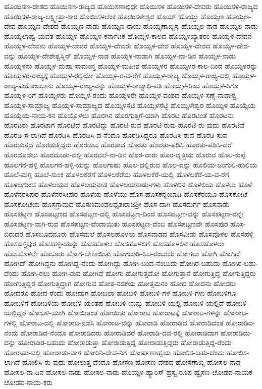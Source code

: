 {ಹೊಯಿಸಣ-ದೇಶದ
ಹೊಯಿಸಣ-ರಾಜ್ಯದ
ಹೊಯಿಸಣಾಭಿಧೇ
ಹೊಯಿಸಳ
ಹೊಯಿಸಳ-ದೇವರು
ಹೊಯಿಸಳ-ರಾಜ್ಯದ
ಹೊಯಿಸಳ-ರಾಜ್ಯ-ಲಕ್ಷ್ಮೀಪ್ರಾ-ಕಾರ
ಹೊಯಿಸಳಲೆಂಕ
ಹೊಯಿಸಳೇಶ್ವರ
ಹೊಯ್
ಹೊಯ್ದು
ಹೊಯ್ಸಣ
ಹೊಯ್ಸಣ-ದೇವ
ಹೊಯ್ಸಣ-ದೇಶದ
ಹೊಯ್ಸಣ-ನಾಡು
ಹೊಯ್ಸಣ-ರಾಯ
ಹೊಯ್ಸಣಾಖ್ಯಸ್ಯ
ಹೊಯ್ಸಲ-ನಾಡ
ಹೊಯ್ಸಲ-ನಾಡು
ಹೊಯ್ಸಲಾಹ್ವ-ಯವತ
ಹೊಯ್ಸಳ
ಹೊಯ್ಸಳ-ಕರ್ನಾಟಕ
ಹೊಯ್ಸಳ-ಕಾಲದ
ಹೊಯ್ಸಳಖ್ಯಾತರಂ
ಹೊಯ್ಸಳ-ದೇವನ
ಹೊಯ್ಸಳ-ದೇವನು
ಹೊಯ್ಸಳ-ದೇವರ
ಹೊಯ್ಸಳ-ದೇವರು
ಹೊಯ್ಸಳ-ದೇಶ
ಹೊಯ್ಸಳ-ದೇಶದ
ಹೊಯ್ಸಳ-ದೇಶ-ವನ್ನು
ಹೊಯ್ಸಳ-ದೇಶೇತ್ವಸ್ಮಿನ್
ಹೊಯ್ಸಳ-ನಾಡ
ಹೊಯ್ಸಳ-ನಾಡಾಗಿ
ಹೊಯ್ಸಳ-ನಾ-ಡಿನ
ಹೊಯ್ಸಳ-ನಾಡು
ಹೊಯ್ಸಳನು
ಹೊಯ್ಸಳ-ಮಹಾ-ಸಾಮಂನ್ತ
ಹೊಯ್ಸಳ-ಮಹೀಶ
ಹೊಯ್ಸಳರ
ಹೊಯ್ಸಳರ-ಕಾಲ-ದಿಂದ
ಹೊಯ್ಸಳರನ್ನು
ಹೊಯ್ಸಳರ-ರಾಜ್ಯಕ್ಕೆ
ಹೊಯ್ಸಳ-ರಲ್ಲಿಯೇ
ಹೊಯ್ಸಳ-ರ-ವ-ರೆಗೆ
ಹೊಯ್ಸಳ-ರಾಜ್ಯ
ಹೊಯ್ಸಳ-ರಾಜ್ಯ-ದಲ್ಲಿ
ಹೊಯ್ಸಳ-ರಾಜ್ಯ-ಪಯೋಜಭಾನು
ಹೊಯ್ಸಳ-ರಾಜ್ಯ-ವನ್ನು
ಹೊಯ್ಸಳ-ರಾಜ್ಯಾಧಿ-ಪತಿ
ಹೊಯ್ಸಳ-ರಿಂದ
ಹೊಯ್ಸಳ-ರಿಗೂ
ಹೊಯ್ಸಳ-ರಿಗೆ
ಹೊಯ್ಸಳರು
ಹೊಯ್ಸಳ-ರೆಂದು
ಹೊಯ್ಸಳರೇ
ಹೊಯ್ಸಳ-ವಂಶದ
ಹೊಯ್ಸಳ-ಸಣ್ನೆ-ನಾಡಾಳ್ವ
ಹೊಯ್ಸಳ-ಸಾಮ್ರಾಜ್ಯ
ಹೊಯ್ಸಳ-ಸಾಮ್ರಾಜ್ಯದ
ಹೊಯ್ಸಳಸೆಟಿ
ಹೊಯ್ಸಳಸೆಟ್ಟಿ
ಹೊಯ್ಸಳೇಶ್ವರ
ಹೊಯ್ಸಿಳ
ಹೊಯ್ಸೆಯ
ಹೊಯ್ಸೆಯ-ನಾಯ-ಕನ
ಹೊಯ್ಸೊಳಲು
ಹೊರಗಿನ
ಹೊರಗುತ್ತಿಗೆ-ಯಾಗಿ
ಹೊರಟ
ಹೊರಟಂತೆ
ಹೊರಟನು
ಹೊರಟರು
ಹೊರಟಾಗ
ಹೊರಟಿದೆ
ಹೊರಟಿದ್ದು
ಹೊರಟಿ-ರುವ
ಹೊರಟಿ-ರುವು
ಹೊರಟಿ-ರು-ವುದು
ಹೊರಟಿವೆ
ಹೊರಡಿ-ಸ-ಲಾಗಿದೆ
ಹೊರಡಿಸಿ
ಹೊರಡಿಸಿ-ದ-ನೆಂದೂ
ಹೊರಡಿಸಿದ್ದರೂ
ಹೊರಡಿಸಿ-ರುವ
ಹೊರಡಿ-ಸುವ
ಹೊರಡುತ್ತದೆ
ಹೊರಡುತ್ತಿದ್ದರು
ಹೊರಡುವ
ಹೊರತಾದ
ಹೊರತು
ಹೊರತು-ಪಡಿಸಿ
ಹೊರತು-ಪಡಿಸಿ-ದರೆ
ಹೊರದೂಡಲು
ಹೊರದೂಡು-ವಲ್ಲಿ
ಹೊರವಲೆ-ನಾ-ಡಿನ
ಹೊರ-ವಾರು
ಹೊರ-ವೃತ್ತಿಯ
ಹೊರುವ
ಹೊಲ-ಕುಪ್ಪೆ
ಹೊಲಗನ-ಹಳ್ಳಿ
ಹೊಲಗನ-ಹಳ್ಳಿ-ಯನ್ನು
ಹೊಲಗಾಹು
ಹೊಲ-ದಲ್ಲಿರುವ
ಹೊಲ-ವನ್ನು
ಹೊಲಿಯ-ಜಂಗುಲಿ-ಹುಲಿಯ
ಹೊಲೆ-ಮಗ್ಗ
ಹೊಲೆ-ಸುಂಕ
ಹೊಳಲಕೆರೆಗೆ
ಹೊಳಲಕೆರೆಯ
ಹೊಳಲಕೆರೆ-ಯಲ್ಲಿ
ಹೊಳಲಕೆರೆ-ಯ-ವ-ರೆಗೆ
ಹೊಳಲಗುಂದ
ಹೊಳಲಯದ
ಹೊಳಲಯನಾಡ
ಹೊಳಲಯನಾಡು-ಗಳು
ಹೊಳಲಿನ
ಹೊಳಲಿಯ
ಹೊಳಲು
ಹೊಳೆ
ಹೊಳೆನರಸಿಪುರ
ಹೊಳೆನರಸೀಪುರ
ಹೊಳೆಯ
ಹೊಳೆಯು
ಹೊಸ
ಹೊಸಕನ್ನಂಬಾಡಿ
ಹೊಸಕೆರಯೂ
ಹೊಸಕೋಟೆ
ಹೊಸಕೋಟೆಯ
ಹೊಸಗ್ರಾಮದ
ಹೊಸಣಮಂಡಲಧೃತಃರಾಜಶ್ರೀ
ಹೊಸ-ದಾಗಿ
ಹೊಸದುರ್ಗ
ಹೊಸನಾಡು
ಹೊಸಪಟ್ಟಣ
ಹೊಸಪಟ್ಟಣದ
ಹೊಸಪಟ್ಟಣ-ದಲ್ಲಿ
ಹೊಸಪಟ್ಟಣ-ದಿಂದ
ಹೊಸಪಟ್ಟಣ-ವನ್ನು
ಹೊಸಪಟ್ಟಣ-ವನ್ನೇ
ಹೊಸಪಟ್ಟಣ-ವಾಗಿ-ರುವ
ಹೊಸಪಟ್ಟಣ-ವೆಂದಾಯಿತು
ಹೊಸಪಟ್ಟಣ-ವೆಂಬ
ಹೊಸಪಟ್ಟಣವೇ
ಹೊಸಪುರ
ಹೊಸ-ಬಿರುದರ
ಹೊಸಬೂದನೂರು
ಹೊಸಮಲೆ
ಹೊಸಲಹೊಳಲು
ಹೊಸವಾಡದ
ಹೊಸವೀಡು
ಹೊಸವೊಳಲ
ಹೊಸಹಳ್ಳಿ
ಹೊಸಹಳ್ಳಿಪುರ
ಹೊಸಹಳ್ಳಿ-ಯನ್ನು
ಹೊಸಹೊಳಲ
ಹೊಸಹೊಳಲಿಗೆ
ಹೊಸಹೊಳಲಿನ
ಹೊಸಹೊಳಲು
ಹೊಸಹೊಳಲೇ
ಹೊಸೂರು
ಹೋಗ-ಬೇಕಾಯಿತು
ಹೋಗಲಾಡಿ-ಸಿದ-ರೆಂಬುದು
ಹೋಗಲು
ಹೋಗಿ
ಹೋಗಿದೆ
ಹೋಗಿದ್
ಹೋಗಿದ್ದನು
ಹೋಗಿದ್ದ-ನೆಂದು
ಹೋಗಿದ್ದು
ಹೋಗಿ-ಬಂದ-ನೆಂಬುದು
ಹೋಗಿರ-ಬಹುದು
ಹೋಗಿರ-ಬಹು-ದೆಂದು
ಹೋಗಿ-ರಲು
ಹೋಗಿ-ರುವ
ಹೋಗಿವೆ
ಹೋಗು
ಹೋಗುತ್ತದೋ
ಹೋಗುತ್ತಾನೆ
ಹೋಗುತ್ತಿದ್ದ
ಹೋಗುತ್ತಿದ್ದರು
ಹೋಗುತ್ತಿದ್ದರೆ
ಹೋಗುತ್ತಿದ್ದಾಗ
ಹೋಗುವ
ಹೋತ-ನಡಕೆಯ
ಹೋತ್ತಮನಂ
ಹೋದ
ಹೋದನು
ಹೋದರು
ಹೋದರೂ
ಹೋದ-ರೆಂದು
ಹೋದಾಗ
ಹೋಬಲಾ
ಹೋಬಳಿ
ಹೋಬಳಿ-ಗಳ
ಹೋಬಳಿ-ಗಳು
ಹೋಬಳಿಗೂ
ಹೋಬಳಿಗೆ
ಹೋಬಳಿಯ
ಹೋಬಳಿ-ಯಂತಹ
ಹೋಬಳಿ-ಯನ್ನು
ಹೋಬಳಿ-ಯಲ್ಲಿ
ಹೋಬಳಿ-ಯಲ್ಲಿದೆ
ಹೋಬಳಿ-ಯಲ್ಲಿದ್ದರೆ
ಹೋಬಳಿ-ಯಾಗಿ
ಹೋಯಿತಂತೆ
ಹೋಯಿತು
ಹೋರಾಟ
ಹೋರಾಟಕ್ಕೆ
ಹೋರಾಟ-ಗಳನ್ನು
ಹೋರಾಟ-ಗಳಲ್ಲಿ
ಹೋರಾಟ-ದಲ್ಲಿ
ಹೋರಾಟ-ನಡೆಸಿ
ಹೋರಾಟ-ವನ್ನು
ಹೋರಾಡಿ
ಹೋರಾಡಿದ
ಹೋರಾಡಿದಂತೆ
ಹೋರಾಡಿದ-ನೆಂದು
ಹೋರಾಡಿದ-ನೆಂದೂ
ಹೋರಾಡಿದರು
ಹೋರಾಡಿದರೆ
ಹೋರಾಡಿ-ದವ-ರಲ್ಲಿ
ಹೋರಾಡಿದಾಗ
ಹೋರಾಡಿದು-ದನ್ನು
ಹೋರಾಡಿರ-ಬಹುದು
ಹೋರಾಡುತ್ತಾ
ಹೋರಾಡುತ್ತಿದ್ದ
ಹೋರಾಡುತ್ತಿದ್ದರು
ಹೋರಾಡುತ್ತಿದ್ದ-ರೆಂದು
ಹೋರಾಡು-ವಲ್ಲಿ
ಹೋರಾಡು-ವಾಗ
ಹೋರಿನಿ-ದೇವ-ನಿಗೆ
ಹೋರ್ಷಣಾಹ್ವಯ
ಹೋಲಿಸ-ಬಹು-ದೆಂದು
ಹೋಲಿಸ-ಲಾಗಿದೆ
ಹೋಲಿಸಿ-ರು-ವುದು
ಹೋಲುತ್ತ-ದೆಂದೂ
ಹೋಸಣ
ಹೋಸಣ-ದೇಶದ
ಹೋಸಣಾಖ್ಯ
ಹೋಸಲ-ನಾಡ
ಹೋಸಲ-ನಾ-ಡಿನ
ಹೋಸಲ-ನಾಡು
ಹೋಸಲ-ನಾಡು-ಹೊಯ್ಸಳ
ಹ್ಯಾರಿಸ್
ಹ್ರಸ್ವ-ರೂಪ
ಹ್ವೈಸಣ
ೞೋಡವ-ನಾಯಕ
ೞೋಡವ-ನಾಯ-ಕರು
}
